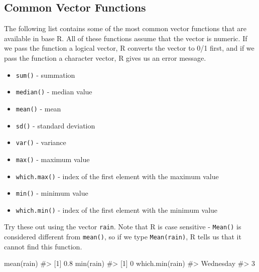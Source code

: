 \documentclass[
  letterpaper,
]{latex/krantz}
\makeatletter
\newenvironment{Shaded}{\begin{snugshade}}{\end{snugshade}}
\newcommand{\CommentTok}[1]{\textcolor[rgb]{0.37,0.37,0.37}{#1}}
\newcommand{\FunctionTok}[1]{\textcolor[rgb]{0.28,0.35,0.67}{#1}}
\newcommand{\NormalTok}[1]{\textcolor[rgb]{0.00,0.23,0.31}{#1}}
\providecommand{\tightlist}{%
  \setlength{\itemsep}{0pt}\setlength{\parskip}{0pt}}\usepackage{longtable,booktabs,array}
\newenvironment{kframe}{%
\medskip{}
\setlength{\fboxsep}{.8em}
 \def\at@end@of@kframe{}%
 \ifinner\ifhmode%
  \def\at@end@of@kframe{\end{minipage}}%
  \begin{minipage}{\columnwidth}%
 \fi\fi%
 \def\FrameCommand##1{\hskip\@totalleftmargin \hskip-\fboxsep
 \colorbox{shadecolor}{##1}\hskip-\fboxsep
     \hskip-\linewidth \hskip-\@totalleftmargin \hskip\columnwidth}%
 \MakeFramed {\advance\hsize-\width
   \@totalleftmargin\z@ \linewidth\hsize
   \@setminipage}}%
 {\par\unskip\endMakeFramed%
 \at@end@of@kframe}
\renewenvironment{Shaded}{\begin{kframe}}{\end{kframe}}
\makeatother
\begin{document}
\subsection{\texorpdfstring{Common Vector Functions
}{Common Vector Functions }}\label{common-vector-functions}

The following list contains some of the most common vector functions
that are available in base R. All of these functions assume that the
vector is numeric. If we pass the function a logical vector, R converts
the vector to 0/1 first, and if we pass the function a character vector,
R gives us an error message.

\begin{itemize}
\tightlist
\item
  \texttt{sum()} - summation 
\item
  \texttt{median()} - median value
\item
  \texttt{mean()} - mean 
\item
  \texttt{sd()} - standard deviation
\item
  \texttt{var()} - variance 
\item
  \texttt{max()} - maximum value
\item
  \texttt{which.max()} - index of the first element with the maximum
  value 
\item
  \texttt{min()} - minimum value
\item
  \texttt{which.min()} - index of the first element with the minimum
  value 
\end{itemize}

Try these out using the vector \texttt{rain}. Note that R is case
sensitive - \texttt{Mean()} is considered different from
\texttt{mean()}, so if we type \texttt{Mean(rain)}, R tells us that it
cannot find this function.

\begin{Shaded}
\begin{Highlighting}[]
\FunctionTok{mean}\NormalTok{(rain)  }
\CommentTok{\#\textgreater{} [1] 0.8}
\FunctionTok{min}\NormalTok{(rain) }
\CommentTok{\#\textgreater{} [1] 0}
\FunctionTok{which.min}\NormalTok{(rain) }
\CommentTok{\#\textgreater{} Wednesday }
\CommentTok{\#\textgreater{}         3}
\end{Highlighting}
\end{Shaded}
\end{document}

